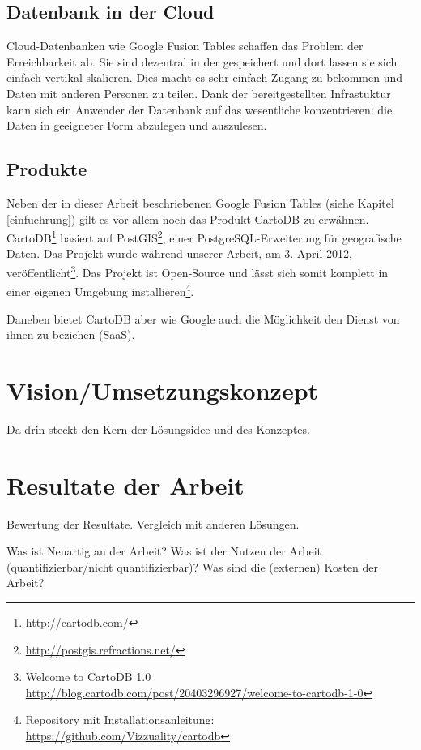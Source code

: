 \subsection{Datenbank in der Cloud}
\gls{Cloud}-Datenbanken wie Google Fusion Tables schaffen das Problem der Erreichbarkeit ab. Sie sind dezentral in der gespeichert und dort lassen sie sich einfach vertikal skalieren. Dies macht es sehr einfach Zugang zu bekommen und Daten mit anderen Personen zu teilen. Dank der bereitgestellten Infrastuktur kann sich ein Anwender der Datenbank auf das wesentliche konzentrieren: die Daten in geeigneter Form abzulegen und auszulesen.

\subsection{Produkte}
Neben der in dieser Arbeit beschriebenen Google Fusion Tables (siehe Kapitel \ref{einfuehrung}) gilt es vor allem noch das Produkt CartoDB zu erwähnen. CartoDB\footnote{\url{http://cartodb.com/}} basiert auf PostGIS\footnote{\url{http://postgis.refractions.net/}}, einer PostgreSQL-Erweiterung für geografische Daten. Das Projekt wurde während unserer Arbeit, am 3. April 2012, veröffentlicht\footnote{Welcome to CartoDB 1.0 \url{http://blog.cartodb.com/post/20403296927/welcome-to-cartodb-1-0}}. Das Projekt ist Open-Source und lässt sich somit komplett in einer eigenen Umgebung installieren\footnote{Repository mit Installationsanleitung: \url{https://github.com/Vizzuality/cartodb}}.

Daneben bietet CartoDB aber wie Google auch die Möglichkeit den Dienst von ihnen zu beziehen (SaaS).

\section{Vision/Umsetzungskonzept}

Da drin steckt den Kern der Lösungsidee und des Konzeptes.

\section{Resultate der Arbeit}

Bewertung der Resultate. Vergleich mit anderen Lösungen. 

Was ist Neuartig an der Arbeit? Was ist der Nutzen der Arbeit (quantifizierbar/nicht quantifizierbar)? Was sind die (externen) Kosten der Arbeit?

